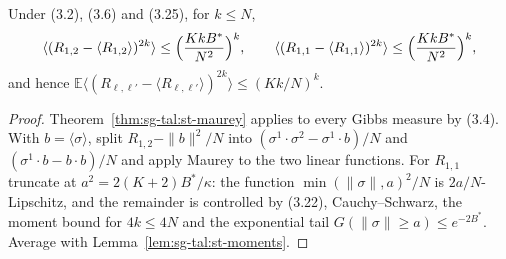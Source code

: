 \begin{theorem}\label{thm:sg-tal:st-gibbs-overlaps}
  \leanok
Under (3.2), (3.6) and (3.25), for $k\le N$,
\[
\langle(R_{1,2}-\langle R_{1,2}\rangle)^{2k}\rangle\le\Bigl(\frac{KkB^*}{N^2}\Bigr)^k,\qquad
\langle(R_{1,1}-\langle R_{1,1}\rangle)^{2k}\rangle\le\Bigl(\frac{KkB^*}{N^2}\Bigr)^k,
\]
and hence $\mathbb E\langle(R_{\ell,\ell'}-\langle R_{\ell,\ell'}\rangle)^{2k}\rangle\le(Kk/N)^k$.
\end{theorem}
\begin{proof}
  \leanok
Theorem~\ref{thm:sg-tal:st-maurey} applies to every Gibbs measure by (3.4). With $b=\langle\sigma\rangle$,
split $R_{1,2}-\|b\|^2/N$ into $(\sigma^1\cdot\sigma^2-\sigma^1\cdot b)/N$ and
$(\sigma^1\cdot b-b\cdot b)/N$ and apply Maurey to the two linear functions. For $R_{1,1}$ truncate at
$a^2=2(K+2)B^*/\kappa$: the function $\min(\|\sigma\|,a)^2/N$ is $2a/N$-Lipschitz, and the remainder is
controlled by (3.22), Cauchy--Schwarz, the moment bound for $4k\le4N$ and the exponential tail
$G(\|\sigma\|\ge a)\le e^{-2B^*}$. Average with Lemma~\ref{lem:sg-tal:st-moments}.
\end{proof}

